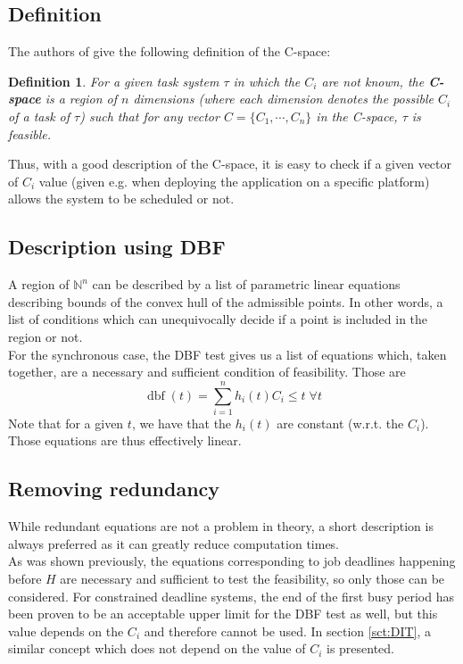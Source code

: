 \documentclass[a4paper,10pt]{article}
\newcommand{\dbf}[1]{\operatorname{dbf}(#1)}
\newtheorem{definition}{Definition}
\begin{document}
\subsection{Definition}

The authors of \cite{george2009characterization} give the following definition of the C-space:
\begin{definition}
For a given task system $\tau$ in which the $C_i$ are not known, the \textbf{C-space} is a region of $n$ dimensions (where each dimension denotes the possible $C_i$ of a task of $\tau$) such that for any vector $C = \{ C_1, \cdots, C_n\}$ in the C-space, $\tau$ is feasible.
\end{definition}

Thus, with a good description of the C-space, it is easy to check if a given vector of $C_i$ value (given e.g. when deploying the application on a specific platform) allows the system to be scheduled or not.

\subsection{Description using DBF}

A region of $\mathbb{N}^n$ can be described by a list of parametric linear equations describing bounds of the convex hull of the admissible points. In other words, a list of conditions which can unequivocally decide if a point is included in the region or not.\\

For the synchronous case, the DBF test gives us a list of equations which, taken together, are a necessary and sufficient condition of feasibility. Those are
$$\dbf{t} = \sum_{i=1}^{n} h_i(t) C_i \leq t \; \forall t$$
Note that for a given $t$, we have that the $h_i(t)$ are constant (w.r.t. the $C_i$). Those equations are thus effectively linear.\\

\subsection{Removing redundancy}

While redundant equations are not a problem in theory, a short description is always preferred as it can greatly reduce computation times.\\

As was shown previously, the equations corresponding to job deadlines happening before $H$ are necessary and sufficient to test the feasibility, so only those can be considered. For constrained deadline systems, the end of the first busy period has been proven to be an acceptable upper limit for the DBF test as well, but this value depends on the $C_i$ and therefore cannot be used. In section \ref{sct:DIT}, a similar concept which does not depend on the value of $C_i$ is presented.\\
\end{document}
